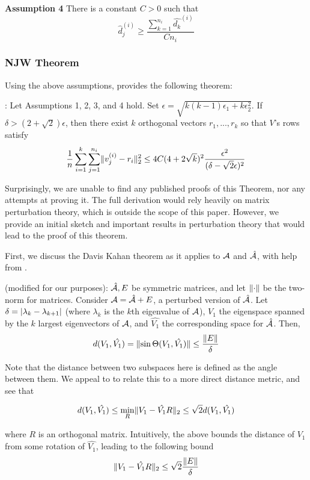 \textbf{Assumption 4}
    There is a constant $C > 0$ such that
\[ \hat{d}_j^{(i)} \geq \frac{\sum_{k=1}^{n_i} \hat{d_k}^{(i)}}{Cn_i} \]


\subsubsection{NJW Theorem}
Using the above assumptions, \cite{ng2002spectral} provides the following
theorem:


: Let Assumptions 1, 2, 3, and 4 hold. Set
$\epsilon = \sqrt{k(k-1)\epsilon_1 + k \epsilon_2^2}$. If
$\delta > (2 + \sqrt{2}) \epsilon$, then there exist $k$ orthogonal vectors
$r_1, ..., r_k$ so that $V$'s rows satisfy
\[ \frac{1}{n} \sum_{i=1}^k \sum_{j=1}^{n_i} \lVert v_j^{(i)} - r_i\rVert_2^2 \leq
    4C (4 + 2 \sqrt{k})^2 \frac{\epsilon^2}{(\delta - \sqrt{2}\epsilon)^2} \]

Surprisingly, we are unable to find any published proofs of this Theorem, nor
any attempts at proving it. The full derivation would rely heavily on matrix
perturbation theory, which is outside the scope of this paper. However, we
provide an initial sketch and important results in perturbation theory that
would lead to the proof of this theorem.

First, we discuss the Davis Kahan theorem as it applies to $\mathcal{A}$ and $\hat{\mathcal{A}}$,
with help from \cite{von2007tutorial}.

 (modified for our purposes):
$\hat{\mathcal{A}}, E$ be symmetric matrices, and let $\lVert\cdot\rVert$ be the two-norm for
matrices. Consider $\mathcal{A} = \hat{\mathcal{A}} + E$, a perturbed version of $\hat{\mathcal{A}}$. Let
$\delta = \lvert\lambda_k - \lambda_{k+1}\rvert$ (where $\lambda_k$ is the $k$th
eigenvalue of $\mathcal{A}$), $V_1$ the eigenspace spanned by the $k$ largest eigenvectors
of $\mathcal{A}$, and $\hat{V_1}$ the corresponding space for $\hat{\mathcal{A}}$. Then,
\[ d(V_1, \hat{V_1}) = \lVert\sin \Theta(V_1, \hat{V_1})\rVert \leq \frac{\lVert E\rVert}{\delta} \]

Note that the distance between two subspaces here is defined as the angle
between them. We appeal to  to relate this to
a more direct distance metric, and see that

\[ d(V_1, \hat{V_1}) \leq \min_{R} \lVert V_1 - \hat{V_1}R\rVert_2 \leq \sqrt{2} d(V_1, \hat{V_1}) \]

where $R$ is an orthogonal matrix. Intuitively, the above bounds the distance
of $V_1$ from some rotation of $\hat{V_1}$, leading to the following bound
\[ \lVert V_1 - \hat{V_1}R\rVert_2 \leq \sqrt{2} \frac{\lVert E\rVert}{\delta} \]

